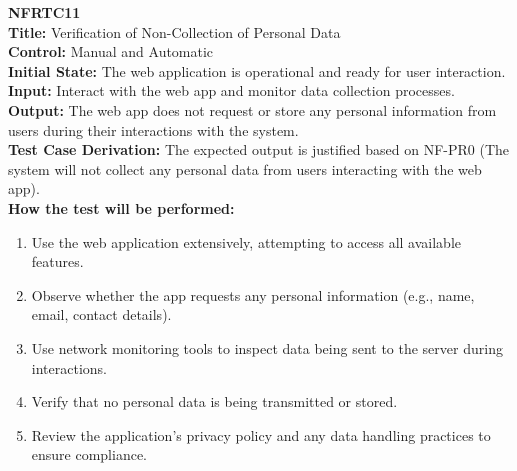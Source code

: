 \documentclass[12pt, titlepage]{article}
\begin{document}
\textbf{NFRTC11}\\
\textbf{Title:} Verification of Non-Collection of Personal Data\\
\textbf{Control:} Manual and Automatic\\
\textbf{Initial State:} The web application is operational and ready for user interaction.\\
\textbf{Input:} Interact with the web app and monitor data collection processes.\\
\textbf{Output:} The web app does not request or store any personal information from users during their interactions with the system.\\
\textbf{Test Case Derivation:} The expected output is justified based on NF-PR0 (The system will not collect any personal data from users interacting with the web app).\\
\textbf{How the test will be performed:}
\begin{enumerate}
  \item Use the web application extensively, attempting to access all available features.
  \item Observe whether the app requests any personal information (e.g., name, email, contact details).
  \item Use network monitoring tools to inspect data being sent to the server during interactions.
  \item Verify that no personal data is being transmitted or stored.
  \item Review the application's privacy policy and any data handling practices to ensure compliance.
\end{enumerate}
\vspace{1em}
\end{document}
